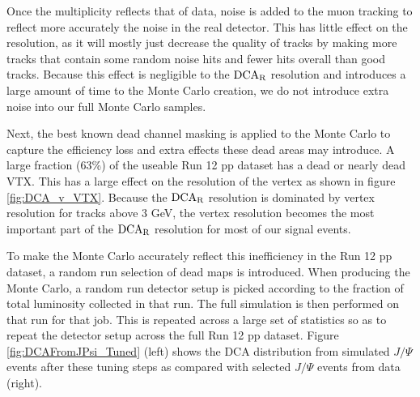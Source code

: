 \documentclass[12pt]{article}
\newcommand{\jpsi}{$J/\Psi$ }
\newcommand{\dcar}{$\rm{DCA}_{R}$ }
\begin{document}


Once the multiplicity reflects that of data, noise is added to the muon tracking to reflect more accurately the noise in the real detector. 
This has little effect on the resolution, as it will mostly just decrease the quality of tracks by making more tracks that contain
some random noise hits and fewer hits overall than good tracks.  Because this effect is negligible to the \dcar resolution and introduces
a large amount of time to the Monte Carlo creation, we do not introduce extra noise into our full Monte Carlo samples.  

Next, the best known dead channel masking is applied to the Monte Carlo to capture the efficiency loss and extra effects these dead areas may introduce.
A large fraction (63\%) of the useable Run 12 pp dataset has a dead or nearly dead VTX.  This has a large effect on the resolution
of the vertex as shown in figure \ref{fig:DCA_v_VTX}.  Because the \dcar resolution is dominated by vertex resolution for tracks above 3 GeV,
the vertex resolution becomes the most important part of the \dcar resolution for most of our signal events.  

To make the Monte Carlo  accurately reflect this inefficiency in the Run 12 pp dataset, a random run selection of dead maps is introduced.  
When producing the Monte Carlo, a random run detector setup is picked according to the fraction of total luminosity collected in that run.  
The full simulation is then performed on that run for that job.  This is repeated across a large set of statistics so as to repeat the detector 
setup across the full Run 12 pp dataset. Figure \ref{fig:DCAFromJPsi_Tuned} (left) shows the DCA distribution from simulated \jpsi events 
after these tuning steps as compared with selected \jpsi events from data (right). 



\end{document}
